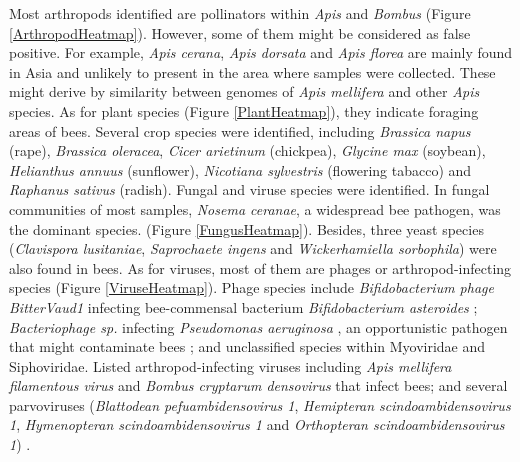 \documentclass[11pt]{article}
\begin{document}
    Most arthropods identified are pollinators within \textit{Apis} and \textit{Bombus} (Figure \ref{ArthropodHeatmap}). 
    However, some of them might be considered as false positive. 
    For example, \textit{Apis cerana}, \textit{Apis dorsata} and \textit{Apis florea} are mainly found in Asia and unlikely to present in the area where samples were collected. 
    These might derive by similarity between genomes of \textit{Apis mellifera} and other \textit{Apis} species. 
    As for plant species (Figure \ref{PlantHeatmap}), they indicate foraging areas of bees. Several crop species were identified, including \textit{Brassica napus} (rape), \textit{Brassica oleracea}, \textit{Cicer arietinum} (chickpea), \textit{Glycine max} (soybean), \textit{Helianthus annuus} (sunflower), \textit{Nicotiana sylvestris} (flowering tabacco) and \textit{Raphanus sativus} (radish). 
    \newline
    Fungal and viruse species were identified. 
    In fungal communities of most samples, \textit{Nosema ceranae}, a widespread bee pathogen, was the dominant species. (Figure \ref{FungusHeatmap}). 
    Besides, three yeast species (\textit{Clavispora lusitaniae}, \textit{Saprochaete ingens} and \textit{Wickerhamiella sorbophila}) were also found in bees.  
    As for viruses, most of them are phages or arthropod-infecting species (Figure \ref{ViruseHeatmap}). 
    Phage species include \textit{Bifidobacterium phage BitterVaud1} infecting bee-commensal bacterium \textit{Bifidobacterium asteroides} \citep{bonilla2020honey}; \textit{Bacteriophage sp.} infecting \textit{Pseudomonas aeruginosa} \citep{essoh2015investigation}, an opportunistic pathogen that might contaminate bees \citep{bailey1968honey,papadopoulou1992experimental,papadopoulou1993haemocyte}; and unclassified species within Myoviridae and Siphoviridae. 
    Listed arthropod-infecting viruses including \textit{Apis mellifera filamentous virus} and \textit{Bombus cryptarum densovirus} that infect bees; and several parvoviruses (\textit{Blattodean pefuambidensovirus 1}, \textit{Hemipteran scindoambidensovirus 1}, \textit{Hymenopteran scindoambidensovirus 1} and \textit{Orthopteran scindoambidensovirus 1}) \citep{penzes2020reorganizing}.
\end{document}
